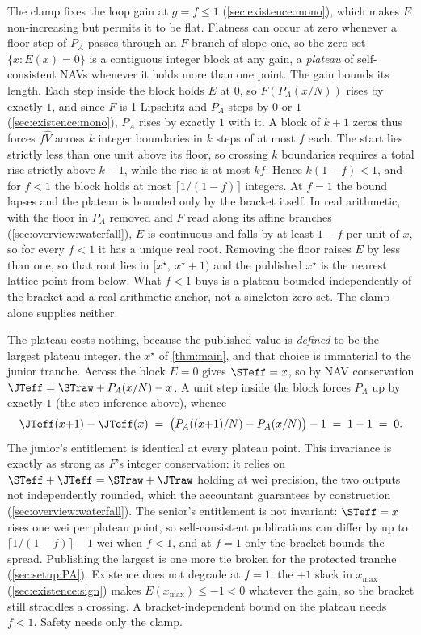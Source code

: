 \begin{remark}
\label{rem:plateau}
The clamp fixes the loop gain at $g = f \leq 1$
(\cref{sec:existence:mono}), which makes $E$ non-increasing but permits
it to be flat. Flatness can occur at zero whenever a floor step of $P_A$
passes through an $F$-branch of slope one, so the zero set
$\{x : E(x) = 0\}$ is a contiguous integer block at any gain, a
\emph{plateau} of self-consistent NAVs whenever it holds more than one
point. The gain bounds its length. Each step inside the block holds $E$
at $0$, so $F(P_A(x/N))$ rises by exactly $1$, and since $F$ is
1-Lipschitz and $P_A$ steps by $0$ or $1$ (\cref{sec:existence:mono}),
$P_A$ rises by exactly $1$ with it. A block of $k+1$ zeros thus forces
$f\widehat{V}$ across $k$ integer boundaries in $k$ steps of at most $f$
each. The start lies strictly less than one unit above its floor, so
crossing $k$ boundaries requires a total rise strictly above $k - 1$,
while the rise is at most $kf$. Hence $k(1-f) < 1$, and for $f < 1$ the
block holds at most $\lceil 1/(1-f) \rceil$ integers. At $f = 1$ the bound lapses
and the plateau is bounded only by the bracket itself. In real
arithmetic, with the floor in $P_A$ removed and $F$ read along its
affine branches (\cref{sec:overview:waterfall}), $E$ is continuous and
falls by at least $1-f$ per unit of $x$, so for every $f < 1$ it has a
unique real root. Removing the floor raises $E$ by less than one, so
that root lies in $[x^\star,\ x^\star + 1)$ and the published $x^\star$
is the nearest lattice point from below. What $f < 1$ buys is a plateau
bounded independently of the bracket and a real-arithmetic anchor, not a
singleton zero set. The clamp alone supplies neither.

The plateau costs nothing, because the published value is \emph{defined} to be
the largest plateau integer, the $x^\star$ of \cref{thm:main}, and that
choice is immaterial to the junior tranche. Across the block $E = 0$
gives $\STeff = x$, so by NAV conservation
$\JTeff = \STraw + P_A(x/N) - x$. A unit step inside the block forces
$P_A$ up by exactly $1$ (the step inference above), whence
\[
  \JTeff(x{+}1) - \JTeff(x)
    \;=\; \bigl(P_A((x{+}1)/N) - P_A(x/N)\bigr) - 1
    \;=\; 1 - 1 \;=\; 0.
\]
The junior's entitlement is identical at every plateau point. This
invariance is exactly as strong as $F$'s integer conservation: it relies
on $\STeff + \JTeff = \STraw + \JTraw$ holding at wei precision, the two
outputs not independently rounded, which the accountant guarantees by
construction (\cref{sec:overview:waterfall}). The senior's entitlement
is not invariant: $\STeff = x$ rises one wei per plateau point, so
self-consistent publications can differ by up to
$\lceil 1/(1-f) \rceil - 1$ wei when $f < 1$, and at $f = 1$ only the
bracket bounds the spread. Publishing the largest is one more tie
broken for the protected tranche (\cref{sec:setup:PA}). Existence does
not degrade at $f = 1$: the $+1$ slack in $x_{\max}$
(\cref{sec:existence:sign}) makes $E(x_{\max}) \leq -1 < 0$ whatever the
gain, so the bracket still straddles a crossing. A bracket-independent bound on the plateau needs
$f < 1$. Safety needs only the clamp.
\end{remark}

